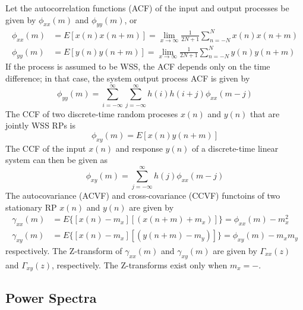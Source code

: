 \documentclass[11pt]{book}
\theoremstyle{example}
\begin{document}
Let the autocorrelation functions (ACF) of the input and output processes be given by $\phi_{xx}(m)$ and $\phi_{yy}(m)$, or
\begin{align}
	\phi_{xx}(m)&=E[x(n)x(n+m)]=\lim_{x\to\infty}{\frac{1}{2N+1}\sum_{n=-N}^N{x(n)x(n+m)}}\\
	\phi_{yy}(m)&=E[y(n)y(n+m)]=\lim_{x\to\infty}{\frac{1}{2N+1}\sum_{n=-N}^N{y(n)y(n+m)}}
\end{align}
If the process is assumed to be WSS, the ACF depends only on the time difference; in that case, the system output process ACF is given by
\begin{equation}
	\phi_{yy}(m)=\sum_{i=-\infty}^\infty\sum_{j=-\infty}^\infty{h(i)h(i+j)\phi_{xx}(m-j)}
\end{equation}
The CCF of two discrete-time random proceses $x(n)$ and $y(n)$ that are jointly WSS RPs is
\begin{equation}
	\phi_{xy}(m)=E[x(n)y(n+m)]
\end{equation}
The CCF of the input $x(n)$ and response $y(n)$ of a discrete-time linear system can then be given as
\begin{equation}
	\phi_{xy}(m)=\sum_{j=-\infty}^\infty{h(j)\phi_{xx}(m-j)}
\end{equation}
The autocovariance (ACVF) and cross-covariance (CCVF) functoins of two stationary RP $x(n)$ and $y(n)$ are given by
\begin{align}
	\gamma_{xx}(m)&=E\{[x(n)-m_x][(x(n+m)+m_x)]\}=\phi_{xx}(m)-m^2_x\\
	\gamma_{xy}(m)&=E\{[x(n)-m_x][(y(n+m)-m_y)]\}=\phi_{xy}(m)-m_xm_y
\end{align}
respectively. The Z-transform of $\gamma_{xx}(m)$ and $\gamma_{xy}(m)$ are given by $\Gamma_{xx}(z)$ and $\Gamma_{xy}(z)$, respectively. The Z-transforms exist only when $m_x=-$.

\subsection{Power Spectra}
\end{document}
